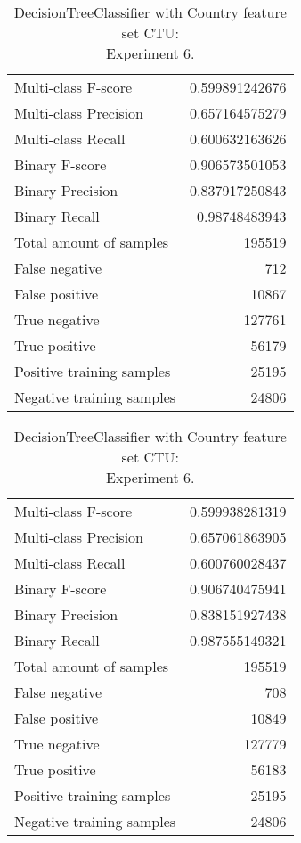 \begin{table}[H]
\begin{minipage}{0.5\textwidth}
\caption{DecisionTreeClassifier with Country feature set CTU: \\Experiment 5.}
\centering
\begin{tabular}{l r}
\toprule
Multi-class F-score & 0.599891242676 \\
Multi-class Precision & 0.657164575279 \\
Multi-class Recall & 0.600632163626 \\
\midrule
Binary F-score & 0.906573501053 \\
Binary Precision & 0.837917250843 \\
Binary Recall & 0.98748483943 \\
\midrule
Total amount of samples & 195519 \\
False negative & 712 \\
False positive & 10867 \\
True negative & 127761 \\
True positive & 56179 \\
\midrule
Positive training samples & 25195 \\
Negative training samples & 24806 \\
\bottomrule
\end{tabular}
\end{minipage}
\hfillx
\begin{minipage}{0.5\textwidth}
\caption{DecisionTreeClassifier with Country feature set CTU: \\Experiment 6.}
\centering
\begin{tabular}{l r}
\toprule
Multi-class F-score & 0.599938281319 \\
Multi-class Precision & 0.657061863905 \\
Multi-class Recall & 0.600760028437 \\
\midrule
Binary F-score & 0.906740475941 \\
Binary Precision & 0.838151927438 \\
Binary Recall & 0.987555149321 \\
\midrule
Total amount of samples & 195519 \\
False negative & 708 \\
False positive & 10849 \\
True negative & 127779 \\
True positive & 56183 \\
\midrule
Positive training samples & 25195 \\
Negative training samples & 24806 \\
\bottomrule
\end{tabular}
\end{minipage}
\end{table}

